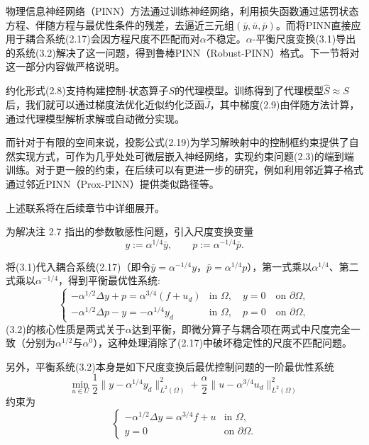 \documentclass{xmu}
\theoremstyle{plain}
\theoremstyle{remark}
\begin{document}
物理信息神经网络（PINN）方法通过训练神经网络，利用损失函数通过惩罚状态方程、伴随方程与最优性条件的残差，去逼近三元组$(\bar{y}, \bar{u}, \bar{p})$。而将PINN直接应用于耦合系统(2.17)会因方程尺度不匹配而对$\alpha$不稳定。$\alpha$-平衡尺度变换(3.1)导出的系统(3.2)解决了这一问题，得到鲁棒PINN（Robust-PINN）格式。下一节将对这一部分内容做严格说明。

约化形式(2.8)支持构建控制-状态算子$S$的代理模型。训练得到了代理模型$\hat{S} \approx S$后，我们就可以通过梯度法优化近似约化泛函$\hat{J}$，其中梯度(2.9)由伴随方法计算，通过代理模型解析求解或自动微分实现。

而针对于有限的空间来说，投影公式(2.19)为学习解映射中的控制框约束提供了自然实现方式，可作为几乎处处可微层嵌入神经网络，实现约束问题(2.3)的端到端训练。对于更一般的约束，在后续可以有更进一步的研究，例如利用邻近算子格式通过邻近PINN（Prox-PINN）提供类似路径等。

上述联系将在后续章节中详细展开。


\label{sec:part2-scaling}

\label{subsec:balanced-scaling}
为解决注 2.7 指出的参数敏感性问题，引入尺度变换变量\cite{4}
\begin{equation}
y := \alpha^{1/4}\bar{y}, \qquad p := \alpha^{-1/4}\bar{p}.
\end{equation}

将(3.1)代入耦合系统(2.17)（即令$\bar{y} = \alpha^{-1/4}y$，$\bar{p} = \alpha^{1/4}p$），第一式乘以$\alpha^{1/4}$、第二式乘以$\alpha^{-1/4}$，得到平衡最优性系统:
\begin{equation}
\begin{cases}
-\alpha^{1/2}\Delta y + p = \alpha^{3/4}(f + u_d) & \text{in } \Omega, \quad y = 0 \quad \text{on } \partial\Omega, \\[6pt]
-\alpha^{1/2}\Delta p - y = -\alpha^{1/4}y_d & \text{in } \Omega, \quad p = 0 \quad \text{on } \partial\Omega,
\end{cases}
\end{equation}
(3.2)的核心性质是两式关于$\alpha$达到平衡，即微分算子与耦合项在两式中尺度完全一致（分别为$\alpha^{1/2}$与$\alpha^0$），这种处理消除了(2.17)中破坏稳定性的尺度不匹配问题。

另外，平衡系统(3.2)本身是如下尺度变换后最优控制问题的一阶最优性系统
\begin{equation}
\min_{u \in U} \frac{1}{2}\|y - \alpha^{1/4}y_d\|^2_{L^2(\Omega)} + \frac{\alpha}{2}\|u - \alpha^{3/4}u_d\|^2_{L^2(\Omega)}
\end{equation}
约束为
\begin{equation}
\begin{cases}
-\alpha^{1/2}\Delta y = \alpha^{3/4}f + u & \text{in } \Omega, \\
y = 0 & \text{on } \partial\Omega.
\end{cases}
\end{equation}
\end{document}
